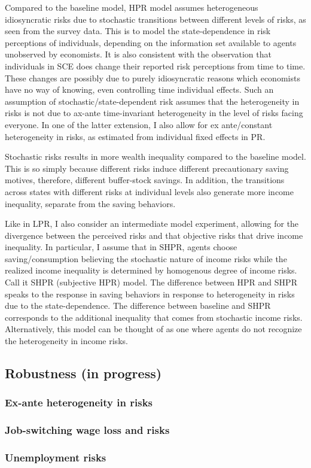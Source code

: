Compared to the baseline model, HPR model assumes heterogeneous idiosyncratic risks due to stochastic transitions between different levels of risks, as seen from the survey data. This is to model the state-dependence in risk perceptions of individuals, depending on the information set available to agents unobserved by economists. It is also consistent with the observation that individuals in SCE does change their reported risk perceptions from time to time. These changes are possibly due to purely idiosyncratic reasons which economists have no way of knowing, even controlling time individual effects. Such an assumption of stochastic/state-dependent risk assumes that the heterogeneity in risks is not due to ax-ante time-invariant heterogeneity in the level of risks facing everyone. In one of the latter extension, I also allow for ex ante/constant heterogeneity in risks, as estimated from individual fixed effects in PR.  

Stochastic risks results in more wealth inequality compared to the baseline model. This is so simply because different risks induce different precautionary saving motives, therefore, different buffer-stock savings. In addition, the transitions across states with different risks at individual levels also generate more income inequality, separate from the saving behaviors. 

Like in LPR, I also consider an intermediate model experiment, allowing for the divergence between the perceived risks and that objective risks that drive income inequality. In particular, I assume that in SHPR, agents choose saving/consumption believing the stochastic nature of income risks while the realized income inequality is determined by homogenous degree of income risks. Call it SHPR (subjective HPR) model. The difference between HPR and SHPR speaks to the response in saving behaviors in response to heterogeneity in risks due to the state-dependence. The difference between baseline and SHPR corresponds to the additional inequality that comes from stochastic income risks.  Alternatively, this model can be thought of as one where agents do not recognize the heterogeneity in income risks. 

\subsection{Robustness (in progress)}

\subsubsection{Ex-ante heterogeneity in risks}

\subsubsection{Job-switching wage loss and risks}

\subsubsection{Unemployment risks}